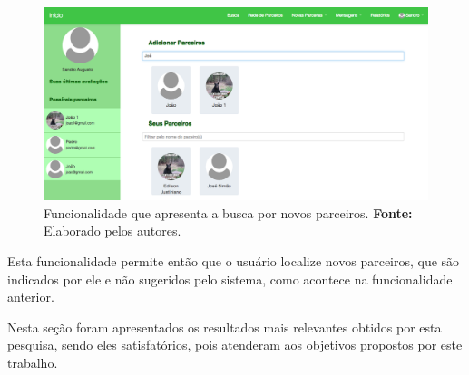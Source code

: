 \begin{figure}[h!]
	\centerline{\includegraphics[scale=0.3]{./imagens/busca-novos-parceiros.png}}
	\caption[Funcionalidade que apresenta a busca por novos parceiros]
	{Funcionalidade que apresenta a busca por novos parceiros. \textbf{Fonte:} Elaborado pelos autores.}
	\label{fig:busca_novos_parceiros}
\end{figure}

\par  Esta funcionalidade permite então que o usuário localize novos parceiros, que são indicados por ele e não sugeridos pelo sistema, como acontece na funcionalidade anterior.

\par Nesta seção foram apresentados os resultados mais relevantes obtidos por esta pesquisa, sendo eles satisfatórios, pois atenderam aos objetivos propostos por este trabalho.
